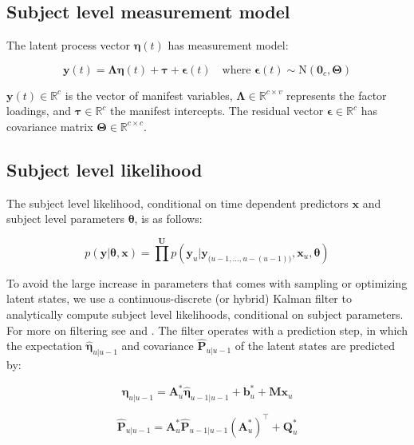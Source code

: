 \documentclass[nojss]{jss}\usepackage[]{graphicx}\usepackage[]{color}
\newcommand{\vect}[1]{\boldsymbol{\mathbf{#1}}}
\begin{document}
\subsection{Subject level measurement model}
The latent process vector $\vect{\eta}(t)$ has measurement model:

\begin{equation}
	\label{eq:measurement}
	\vect{y}(t) = \vect{\Lambda} \vect{\eta}(t) + \vect{\tau} + \vect{\epsilon}(t)  
	\quad \text{where } \vect{\epsilon}(t) \sim  \mathrm{N} (\vect{0}_c, \vect{\Theta})
\end{equation}

$\vect{y} (t)\in\mathbb{R}^{c}$ is the vector of manifest variables, $\vect{\Lambda} \in \mathbb{R}^{c \times v}$ represents the factor loadings, and $\vect{\tau} \in\mathbb{R}^{c}$ the manifest intercepts. The residual vector $\vect{\epsilon} \in \mathbb{R}^{c}$ has covariance matrix $\vect{\Theta} \in\mathbb{R}^{c \times c}$.


\subsection{Subject level likelihood}
The subject level likelihood, conditional on time dependent predictors $\vect{x}$ and subject level parameters $\vect{\theta}$, is as follows:

\begin{equation}
	p(\vect{y} | \vect{\theta}, \vect{x}) = \prod^{\vect{U}} p(\vect{y}_u | \vect{y}_{\big(u-1,...,u-(u-1)\big)}, \vect{x}_u, \vect{\theta})
\end{equation}

To avoid the large increase in parameters that comes with sampling or optimizing latent states, we use a continuous-discrete (or hybrid) Kalman filter to analytically compute subject level likelihoods, conditional on subject parameters. For more on filtering see \citet{jazwinski2007stochastic} and \citet{sarkka2013Bayesian}. The filter operates with a prediction step, in which the expectation $\hat{\vect{\eta}}_{u|u-1}$ and covariance $\hat{\vect{P}}_{u|u-1}$ of the latent states are predicted by:

\begin{equation}
	\hat{\vect{\eta}}_{u|u-1} = \vect{A}^*_u \hat{\vect{\eta}}_{u-1|u-1} + \vect{b}^*_u + \vect{M}\vect{x}_u 
\end{equation}

\begin{equation}
	\hat{\vect{P}}_{u|u-1} = \vect{A}^*_u \hat{\vect{P}}_{u-1|u-1} (\vect{A}^*_u)^{\top}+ \vect{Q}^*_u
\end{equation}
\end{document}
